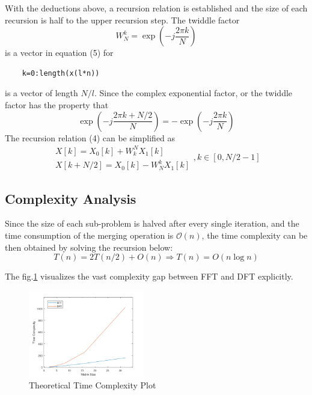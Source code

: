\documentclass[conference]{IEEEtran}
\begin{document}
With the deductions above, a recursion relation is established and the size of each recursion is half to the upper recursion step. The twiddle factor
\begin{equation}
	W_{N}^{k}=\exp(-j \frac{2\pi k}{N})
\end{equation}
is a vector in equation (5) for
\begin{lstlisting}
    k=0:length(x(l*n))
\end{lstlisting}
is a vector of length \( N/l \). Since the complex exponential factor, or the twiddle factor has the property that
\begin{equation}
	\exp \left( -j \frac{2\pi k+N/2}{N} \right) =-\exp \left( -j\frac{2\pi k}{N} \right)
\end{equation}
The recursion relation (4) can be simplified as
\begin{equation}
	\begin{matrix}
		X[k]=X_{0}[k]+W_{k}^{N}X_{1}[k] \\
		X[k+N/2]=X_{0}[k]-W_{N}^{k}X_{1}[k]
	\end{matrix},
	k\in[0,N/2-1]
\end{equation}

\subsection{Complexity Analysis}
Since the size of each sub-problem is halved after every single iteration, and the time consumption of the merging operation is \( \mathcal{O} (n) \), the time complexity can be then obtained by solving the recursion below:
\begin{equation}
	T(n)=2T(n/2)+O(n)\Rightarrow T(n)=O(n\log n)
\end{equation}

The fig.\ref{fig:theo_fft.png} visualizes the vast complexity gap between FFT and DFT explicitly.

\begin{figure}[htpb]
	\centering
	\includegraphics[width=0.45\textwidth]{theo_fft.png}
	\caption{Theoretical Time Complexity Plot}
	\label{fig:theo_fft.png}
\end{figure}
\end{document}
